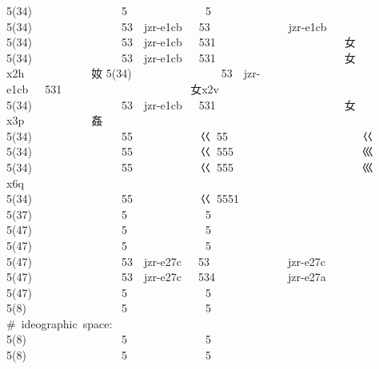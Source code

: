 5(34)               { }5             { }5                         {} 
5(34)               { }53  jzr-e1cb  { }53              jzr-e1cb  {} 
5(34)               { }53  jzr-e1cb  { }531                       {\cjk{}女} 
5(34)               { }53  jzr-e1cb  { }531                       {\cjk{}女}x2h            {\cjk{}奻} 
5(34)               { }53  jzr-e1cb  { }531                       {\cjk{}女}x2v            {} 
5(34)               { }53  jzr-e1cb  { }531                       {\cjk{}女}x3p            {\cjk{}姦} 
5(34)               { }55            {\cjk{}巜} 55                        {\cjk{}巜} 
5(34)               { }55            {\cjk{}巜} 555                       {\cjk{}巛} 
5(34)               { }55            {\cjk{}巜} 555                       {\cjk{}巛}x6q            {} 
5(34)               { }55            {\cjk{}巜} 5551                      {} 
5(37)               {\cjk{}} 5             {\cjk{}} 5                         {\cjk{}} 
5(47)               {\cjk{}} 5             {\cjk{}} 5                         {\cjk{}} 
5(47)               {\cjk{}} 5             {\cjk{}} 5                         {\cjk{}} 
5(47)               {\cjk{}} 53  jzr-e27c  { }53              jzr-e27c  {} 
5(47)               {\cjk{}} 53  jzr-e27c  { }534             jzr-e27a  {} 
5(47)               {\cjk{}} 5             {\cjk{}} 5                         {\cjk{}} 
5(8)                {\cjk{}} 5             {\cjk{}} 5                         {\cjk{}} 
\# ideographic space: 
5(8)                {\cjk{}{\cnsym{}　} }5             {\cjk{}{\cnsym{}　} }5                         {\cjk{}{\cnsym{}　}} 
5(8)                { }5             { }5                         {} 
